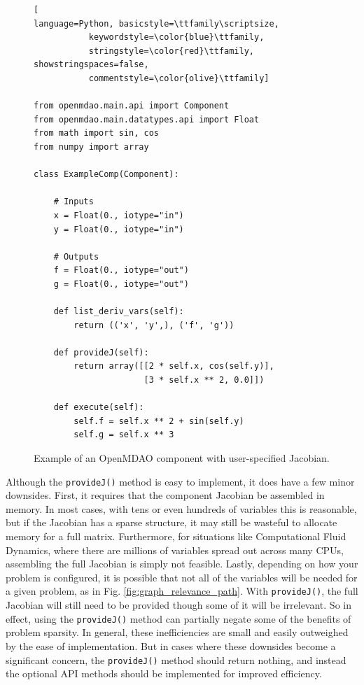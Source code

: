 \documentclass[]{aiaa-tc} %
\begin{document}
\begin{figure}
\begin{minipage}{\textwidth}
\begin{lstlisting}[
language=Python, basicstyle=\ttfamily\scriptsize,
           keywordstyle=\color{blue}\ttfamily,
           stringstyle=\color{red}\ttfamily, showstringspaces=false,
           commentstyle=\color{olive}\ttfamily]

from openmdao.main.api import Component
from openmdao.main.datatypes.api import Float
from math import sin, cos
from numpy import array

class ExampleComp(Component):

    # Inputs
    x = Float(0., iotype="in")
    y = Float(0., iotype="in")

    # Outputs
    f = Float(0., iotype="out")
    g = Float(0., iotype="out")

    def list_deriv_vars(self):
        return (('x', 'y',), ('f', 'g'))

    def provideJ(self):
        return array([[2 * self.x, cos(self.y)],
                      [3 * self.x ** 2, 0.0]])

    def execute(self):
        self.f = self.x ** 2 + sin(self.y)
        self.g = self.x ** 3

\end{lstlisting}
\caption{Example of an OpenMDAO
component with user-specified Jacobian.
\label{fig:code-block-1}}
\end{minipage}

\end{figure}

        Although the \texttt{provideJ()} method is easy to implement, it does have a few minor downsides. First,
        it requires that the component Jacobian be assembled in memory. In most cases, with tens or even hundreds of variables
        this is reasonable, but if the Jacobian has a sparse structure, it may still be wasteful to allocate memory for a
        full matrix. Furthermore, for situations like Computational Fluid Dynamics, where there are millions of variables spread out
        across many CPUs, assembling the full Jacobian is simply not feasible. Lastly, depending on how
        your problem is configured, it is possible that not all of the variables will be needed for a given problem, as in Fig. \ref{fig:graph_relevance_path}.
        With \texttt{provideJ()}, the full Jacobian will still need to be provided though some of it will be irrelevant.
        So in effect, using the \texttt{provideJ()} method can partially negate some of the benefits of problem sparsity.
        In general, these inefficiencies are small and easily outweighed by the ease of implementation. But in cases where
        these downsides become a significant concern, the \texttt{provideJ()} method should return nothing, and instead the
        optional API methods should be implemented for improved efficiency.
\end{document}
